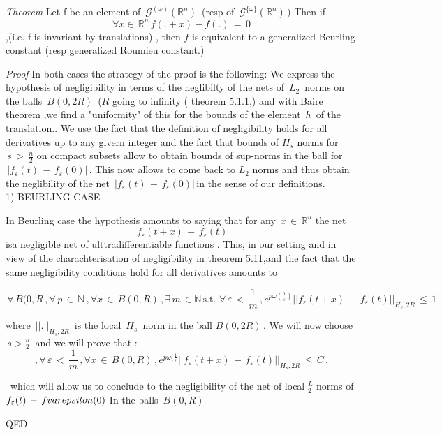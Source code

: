 \documentclass[10pt,a4paper]{amsart}
\newcommand{\NN}{\mathbb N}
\newcommand{\RR}{\mathbb R}
\newenvironment{proof}{\emph{Proof} }{QED}
\newenvironment{theorem}{\emph{Theorem} }{\smallskip}
\begin{document}
\begin{theorem}
Let f be an element of
 $\, \mathcal{G}^{(\omega)}(\RR^n)\,$
(resp of $\,\mathcal{G}^{\{\omega\}}(\RR^n)\,)$ 
Then if 
$$\forall x\in\,\RR^n\,f(.+x) -f(.) \,
=\,0 
$$ ,(i.e. f is invariant by translations) , then $f$ is equivalent to a generalized Beurling constant (resp generalized Roumieu constant.)
 \end{theorem}

\begin{proof}
 In both cases the strategy of the proof is the following:
 We express the hypothesis of negligibility in terms of the neglibilty of the nets of $\,L_2\,$ norms on the balls $\,B(0,2R)\,$ ($R$ going to infinity ( theorem 5.1.1,) and with Baire theorem  ,we find a "uniformity" of this for the bounds of the  element $\,h\,$ of the translation..  We use the fact that the definition of negligibility holds for all derivatives up to any givern integer and the fact that bounds of $ H_s   $ norms for
  $\,s\,>\, \frac{n}{2}$ on compact subsets
 allow to obtain bounds of sup-norms in the ball for
  $\,|f_\varepsilon(t)\,-\,f_\varepsilon(0)|\,.$ This now allows to come back to $L_2$ norms and thus obtain the neglibility 
   of the net  $\,|f_\varepsilon(t)\,-\,f_\varepsilon(0)|\,$in the sense of our definitions. 
   \\
1) BEURLING CASE



In Beurling case the hypothesis amounts to saying that for any
 $\, x \,\in\,\RR^n$  the net
$$\,f_\varepsilon(t+x)\,-\,f_\varepsilon(t)$$ isa negligible net of ulttradifferentiable functions .
 This, in our setting and in view of the charachterisation of negligibility in theorem 5.11,and the fact that the same negligibility conditions hold for all derivatives  amounts to  
 

$$\,\forall \,B(0,R\,,\forall\,p\,\in \,\NN\,,\forall x \,\in\,B(0,R)\,,\exists \,m\,\in \NN \,\mbox{s.t.}\,
\,\forall \,\varepsilon \,<\,\frac{1}{m}\,,
e^{p\omega(\frac{1}{\varepsilon})}||f_\varepsilon(t+x)\,-\,
f_\varepsilon(t) ||_{H_s,2R}\,\leq\,1 $$


 where $\,||.||_{H_s,2R}\,$ is the local $\,H_s\,$ norm in the ball  $B(0,2R)\,.$
 We will now choose $\, s>\frac{n}{2}\,$ and we will prove that :
$$,\forall \,\varepsilon \,<\,\frac{1}{m}\,, \forall x\,\in\,B(0,R)\,,
e^{p\omega(\frac{1}{\varepsilon}}||f_\varepsilon(t+x)\,-\,
f_\varepsilon(t) ||_{H_s,2R}\,\leq\,C\,.$$

\  which will allow us to conclude to the negligibility of the net of local  $^L_2$ norms of
   $f_\varepsilon(t) \,-\,f\\varepsilon(0)$ In the balls  
   $\,B(0,R)\,$
    

\end{proof}
\end{document}
